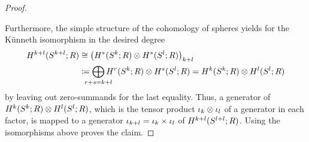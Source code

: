 \begin{Cor}
\begin{proof}
\begin{center}
    \end{center}
    Furthermore, the simple structure of the cohomology of spheres
    yields for the Künneth isomorphism in the desired degree
    \begin{align*}
      \H^{\rkk+\rkl}(\Sphere{\rkk+\rkl};R)
      &\cong
        \left(\H^*(\Sphere{\rkk}; R)\otimes \H^*(\Sphere{\rkl}; R)\right)_{\rkk+\rkl}\\
      &\coloneqq
        \bigoplus_{\mathclap{r+s=\rkk+\rkl}}
        \H^r(\Sphere{\rkk};R)\otimes \H^s(\Sphere{\rkl};R)
        =
        \H^{\rkk}(\Sphere{\rkk};R)\otimes \H^{\rkl}(\Sphere{\rkl};R)
    \end{align*}
    by leaving out zero-summands for the last equality.
    Thus, a generator of
    $H^{k}(S^{k}; R)\otimes H^{l}(S^{l}; R)$,
    which is the tensor product $\iota_{k}\otimes\iota_{l}$ of a generator
    in each factor,
    is mapped to a generator $\iota_{k+l}=\iota_{k}\times\iota_{l}$ of
    $H^{k+l}(S^{l+l}; R)$.
    Using the isomorphisms above proves the claim.
  \end{proof}
\end{Cor}

